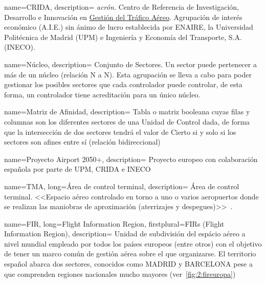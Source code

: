 {
    name={CRIDA},
    description=
    {   
        \textit{acrón.} Centro de Referencia de Investigación, Desarrollo e Innovación 
        en \hyperref[ATC]{Gestión del Tráfico Aéreo}. Agrupación de interés económico (A.I.E.) sin ánimo de lucro 
        establecida por ENAIRE, la Universidad Politécnica de Madrid (UPM) e Ingeniería y Economía del Transporte, S.A. 
        (INECO).~\cite{CRIDA-web}
    }
}

{
    name={Núcleo},
    description=
    {   
        Conjunto de Sectores. Un sector puede pertenecer a más de un núcleo (relación N a N). Esta 
        agrupación se lleva a cabo para poder gestionar los posibles sectores que cada controlador puede controlar, de 
        esta 
        forma, un controlador tiene acreditación para un único núcleo.
    }
}

{
    name={Matriz de Afinidad},
    description=
    {   
        Tabla o matriz booleana cuyas filas y columnas son los diferentes sectores de 
        una Unidad de Control dada, de forma que la intersección de dos sectores tendrá el valor de Cierto si y solo si 
        los sectores son afines entre sí (relación bidireccional)
    }
}

{
    name={Proyecto Airport 2050+},
    description=
    {   
        Proyecto europeo con colaboración española por parte de UPM, CRIDA e INECO
    }
}

{
    name={TMA},
    long={Área de control terminal},
    description=
    {   
        Área de control terminal. <<Espacio aéreo controlado en torno a uno o varios aeropuertos 
        donde se realizan las maniobras de aproximación (aterrizajes y despegues)>>~\cite{ENAIRE-web}.
    }
}

{
    name={FIR},
    long={Flight Information Region},
    firstplural={FIRs (Flight Information Region)},
    description=
    {   
        Unidad de subdivisión del espácio aéreo a nivel mundial empleado por todos los países europeos (entre otros) 
        con el objetivo de tener un marco común de gestión aérea sobre el que organizarse. El territorio español abarca 
        dos sectores, conocidos como MADRID y BARCELONA pese a que comprenden regiones nacionales mucho mayores 
        (ver~\autoref{fig:2:fireuropa})
    }
}



